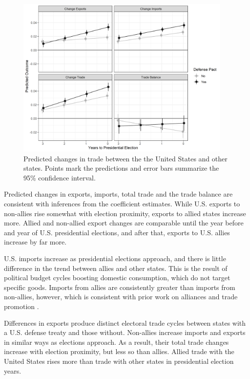 \documentclass[12pt]{article}
\begin{document}
\begin{figure}[htpb]
	\centering
		\includegraphics[width=0.95\textwidth]{../figures/us-elec-pred.png}
	\caption{Predicted changes in trade between the the United States and other states. Points mark the predictions and error bars summarize the 95\% confidence interval.}
	\label{fig:us-elec-pred}
\end{figure}


Predicted changes in exports, imports, total trade and the trade balance are consistent with inferences from the coefficient estimates. 
While U.S. exports to non-allies rise somewhat with election proximity, exports to allied states increase more. 
Allied and non-allied export changes are comparable until the year before and year of U.S. presidential elections, and after that, exports to U.S. allies increase by far more. 


U.S. imports increase as presidential elections approach, and there is little difference in the trend between allies and other states. 
This is the result of political budget cycles boosting domestic consumption, which do not target specific goods.
Imports from allies are consistently greater than imports from non-allies, however, which is consistent with prior work on alliances and trade promotion \citep{GowaMansfield2004}. 


Differences in exports produce distinct electoral trade cycles between states with a U.S. defense treaty and those without. 
Non-allies increase imports and exports in similar ways as elections approach. 
As a result, their total trade changes increase with election proximity, but less so than allies. 
Allied trade with the United States rises more than trade with other states in presidential election years. 
\end{document}
